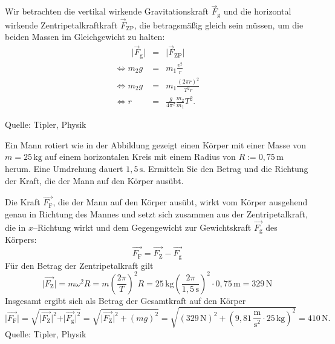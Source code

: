 \begin{MExercises}
\begin{MExercise}
  \begin{MSolution}
  Wir betrachten die vertikal wirkende Gravitationskraft $\vec{F}_{\textrm{g}}$ und die horizontal wirkende Zentripetalkraftkraft $\vec{F}_{{\textrm{ZP}}}$, die betragsm\"a{\ss}ig gleich sein m\"ussen, um die beiden Massen im Gleichgewicht zu halten:
  \begin{eqnarray*}
  \qquad\vert\vec{F}_{\textrm{g}}\vert&=&\vert\vec{F}_{\textrm{ZP}}\vert\\
  \Leftrightarrow m_2g&=&m_1\frac{v^2}{r}\\
  \Leftrightarrow m_2g&=&m_1\frac{(2\pi r)^2}{T^2r}\\
  \Leftrightarrow r&=&\frac{g}{4\pi^2}\frac{m_2}{m_1}T^2.
  \end{eqnarray*}
  \end{MSolution}
  Quelle: Tipler, Physik
  \end{MExercise}
  
  \begin{MExercise}
  Ein Mann rotiert wie in der Abbildung gezeigt einen K\"orper mit einer Masse von $m=25\,\text{kg}$ auf einem horizontalen Kreis mit einem Radius von $R:=0{,}75\,\text{m}$ herum. Eine Umdrehung dauert $1{,}5\,\text{s}$. Ermitteln Sie den Betrag und die Richtung der Kraft, die der Mann auf den K\"orper aus\"ubt. 
  
  
  
  \begin{MSolution}
  Die Kraft $\vec{F_{\textrm{F}}}$, die der Mann auf den K\"orper aus\"ubt, wirkt vom K\"orper ausgehend genau in Richtung des Mannes und setzt sich zusammen aus der Zentripetalkraft, die in $x$--Richtung wirkt und dem Gegengewicht zur Gewichtskraft $\vec{F_{\textrm{g}}}$ des K\"orpers:
  \begin{equation*}
  \vec{F_{\textrm{F}}}=\vec{F_{\textrm{Z}}}-\vec{F_{\textrm{g}}}
  \end{equation*}
  F\"ur den Betrag der Zentripetalkraft gilt
  \begin{equation*}
  \vert\vec{F_{\textrm{Z}}}\vert=m\omega^2R=m\left(\frac{2\pi}{T}\right)^2R=25\,\text{kg}\left(\frac{2\pi}{1,5\,\text{s}}\right)^2\cdot 0,75\,\text{m}=329\,\text{N}
  \end{equation*}Insgesamt ergibt sich als Betrag der Gesamtkraft auf den K\"orper
  \begin{equation*}
  \vert\vec{F_{\textrm{F}}}\vert=\sqrt{\vert\vec{F_{\textrm{Z}}}\vert^2+\vert\vec{F_{\textrm{g}}}\vert^2}=\sqrt{\vert\vec{F_{\textrm{Z}}}
  \vert^2+(mg)^2}=\sqrt{(329\,\text{N})^2+\left(9{,}81\,\frac{\text{m}}{\text{s}^2}\cdot 
  25\,\text{kg}\right)^2}=410\,\text{N}.
    \end{equation*}
    Quelle: Tipler, Physik
  \end{MSolution}
  \end{MExercise}
  

\end{MExercises}
